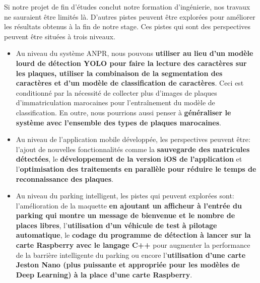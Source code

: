 Si notre projet de fin d’études conclut notre formation d’ingénierie, nos travaux ne sauraient être limités là. D’autres pistes peuvent être explorées pour améliorer les résultats obtenus à la fin de notre stage. Ces pistes qui sont des perspectives peuvent être situées à trois niveaux.
    \begin{itemize}
        \item Au niveau du système ANPR, nous pouvons \textbf{utiliser au lieu d’un modèle lourd de détection YOLO pour faire la lecture des caractères sur les plaques, utiliser la combinaison de la segmentation des caractères et d’un modèle de classification de caractères}. Ceci est conditionné par la nécessité de collecter plus d’images de plaques d’immatriculation marocaines pour l'entraînement du modèle de classification. En outre, nous pourrions aussi penser à \textbf{généraliser le système avec l'ensemble des types de plaques marocaines}.
        
        \item Au niveau de l’application mobile développée, les perspectives peuvent être: l'ajout de nouvelles fonctionnalités comme la \textbf{sauvegarde des matricules détectées}, le \textbf{développement de la version iOS de l’application} et l’\textbf{optimisation des traitements en parallèle pour réduire le temps de reconnaissance des plaques}.
        
        \item Au niveau du parking intelligent, les pistes qui peuvent explorées sont: l’amélioration de la maquette \textbf{en ajoutant un afficheur à l'entrée du parking qui montre un message de bienvenue et le nombre de places libres}, l’\textbf{utilisation d'un véhicule de test à pilotage automatique}, le \textbf{codage du programme de détection à lancer sur la carte Raspberry avec le langage C++} pour augmenter la performance de la barrière intelligente du parking ou encore l'\textbf{utilisation d'une carte Jeston Nano (plus puissante et appropriée pour les modèles de Deep Learning) à la place d'une carte Raspberry}.
    \end{itemize}